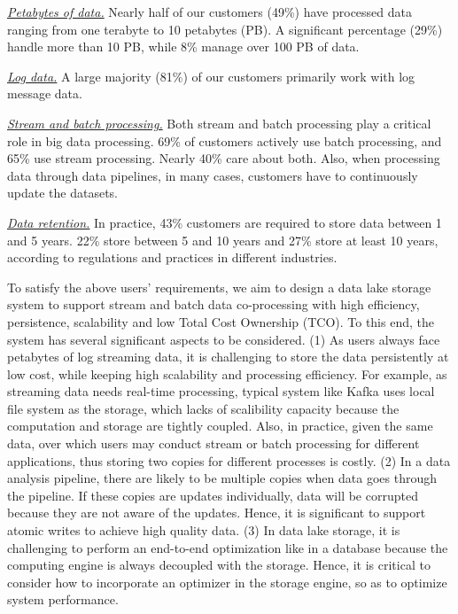 \noindent \underline{\textit{Petabytes of data.}} Nearly half of our customers (49\%) have processed data ranging from one terabyte to 10 petabytes (PB). A significant percentage (29\%) handle more than 10 PB, while 8\% manage over 100 PB of data.


\noindent \underline{\textit{Log data.}} A large majority (81\%) of our customers primarily work with log message data.

\noindent \underline{\textit{Stream and batch processing.}} Both stream and batch processing play a critical role in big data processing. 69\% of  customers actively use batch processing, and 65\% use stream processing. Nearly 40\%  care about both. 
Also, when processing data through data pipelines, in many cases, customers  have to continuously  update the datasets.

\noindent \underline{\textit{Data retention.}} In practice, 43\% customers are required to store data between 1 and 5 years. 22\% store between 5 and 10 years and 27\% store at least 10 years, according to regulations and practices in different industries.


To satisfy the above users' requirements, we aim to design a data lake storage system to support stream and batch data co-processing with high efficiency, persistence, scalability and low Total Cost Ownership (TCO). To this end, the system has several significant aspects  to be considered. (1) As users always face petabytes of log streaming data, it is challenging to store the data persistently at low cost, while keeping high scalability and processing efficiency. For example, as streaming data needs real-time processing,  typical system like Kafka uses local file system as the storage, which lacks of scalibility capacity because the computation and storage are tightly coupled. Also, in practice, given the same data, over which users may conduct stream or batch processing for different applications, thus storing two copies for different processes is costly.
(2) In a data analysis pipeline, there are likely to be multiple copies when data goes through the pipeline. If these copies are updates individually, data  will be corrupted because   they are not aware of the updates.   
 Hence, it is significant to support atomic writes to achieve high quality data.
(3) In data lake storage,  it is challenging to perform an end-to-end optimization like in a database because the computing engine is always decoupled with the storage. Hence, it is critical to consider how to incorporate an optimizer in the storage engine, so as to optimize system performance.



